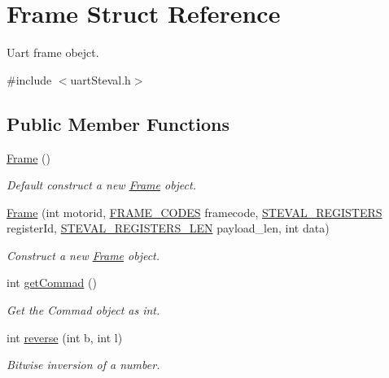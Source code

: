 \hypertarget{structFrame}{}\section{Frame Struct Reference}
\label{structFrame}


Uart frame obejct.  




{\ttfamily \#include $<$uart\+Steval.\+h$>$}

\subsection*{Public Member Functions}
\begin{DoxyCompactItemize}
\item 
\mbox{\label{structFrame_ad2e5946cf41d4817e750500acf05d02b}} 
\hyperlink{structFrame_ad2e5946cf41d4817e750500acf05d02b}{Frame} ()
\begin{DoxyCompactList}\small\item\em Default construct a new \hyperlink{structFrame}{Frame} object. \end{DoxyCompactList}\item 
\hyperlink{structFrame_aa3e7c6b3f70eb267395ec98251914bd0}{Frame} (int motorid, \hyperlink{registers_8h_a9360bf1cda059a1f526e614bdc708067}{F\+R\+A\+M\+E\+\_\+\+C\+O\+D\+ES} framecode, \hyperlink{registers_8h_a1a02f5486dc2072d20b8c0efc8d66780}{S\+T\+E\+V\+A\+L\+\_\+\+R\+E\+G\+I\+S\+T\+E\+RS} register\+Id, \hyperlink{registers_8h_a420772e8eb2fd0b2ef06da094afb6f59}{S\+T\+E\+V\+A\+L\+\_\+\+R\+E\+G\+I\+S\+T\+E\+R\+S\+\_\+\+L\+EN} payload\+\_\+len, int data)
\begin{DoxyCompactList}\small\item\em Construct a new \hyperlink{structFrame}{Frame} object. \end{DoxyCompactList}\item 
int \hyperlink{structFrame_aebb6a947cb2f14b6eaf79fcda9c36cdc}{get\+Commad} ()
\begin{DoxyCompactList}\small\item\em Get the Commad object as int. \end{DoxyCompactList}\item 
int \hyperlink{structFrame_ac2ac164080c777c32ed8e9e69686f73b}{reverse} (int b, int l)
\begin{DoxyCompactList}\small\item\em Bitwise inversion of a number. \end{DoxyCompactList}\end{DoxyCompactItemize}
